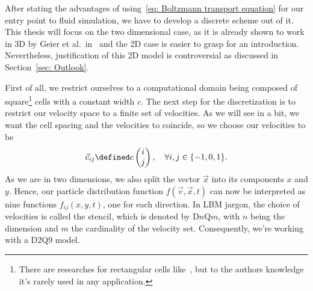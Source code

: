 After stating the advantages of using~\eqref{eq: Boltzmann transport equation} for our entry point to fluid simulation, we have to develop a discrete scheme out of it.
This thesis will focus on the two dimensional case, as it is already shown to work in 3D by Geier et al.\ in~\cite{geier2015cumulant} and the 2D case is easier to grasp for an introduction. Nevertheless, justification of this 2D model is controversial as discussed in Section~\ref{sec: Outlook}.

First of all, we restrict ourselves to a computational domain being composed of square\footnote{There are researches for rectangular cells like~\cite{Bouzidi2001704}, but to the authors knowledge it's rarely used in any application.} cells with a constant width $c$.
The next step for the discretization is to restrict our velocity space to a finite set of velocities. As we will see in a bit, we want the cell spacing and the velocities to coincide, so we choose our velocities to be
\begin{equation}
  \label{eq: definition of the velocities}
  \vec{c}_{ij} \defined c\begin{pmatrix}i \\ j\end{pmatrix}, \quad\forall i,j\in \{-1, 0, 1\}.
\end{equation}
As we are in two dimensions, we also split the vector $\vec{x}$ into its components $x$ and $y$.
Hence, our particle distribution function $f(\vec{v},\vec{x},t)$ can now be interpreted as nine functions $f_{ij}(x,y,t)$, one for each direction.
In LBM jargon, the choice of velocities is called the stencil, which is denoted by D$n$Q$m$, with $n$ being the dimension and $m$ the cardinality of the velocity set. Consequently, we're working with a D2Q9 model.

